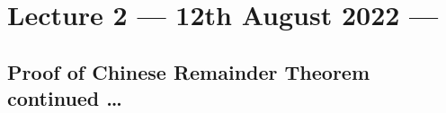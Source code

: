 \section{Lecture 2 --- 12th August 2022 --- }
\subsection{Proof of Chinese Remainder Theorem continued \ldots}
